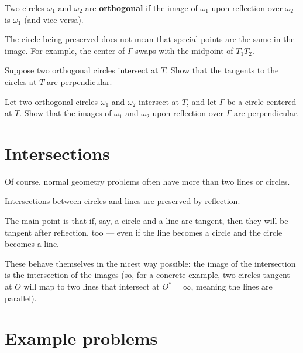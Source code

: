 \documentclass{scrartcl}
\providecommand{\alert}{\textbf}
\begin{document}
\begin{definition}
	Two circles $\omega_1$ and $\omega_2$ are \alert{orthogonal}
	if the image of $\omega_1$ upon reflection over $\omega_2$
	is $\omega_1$ (and vice versa).
\end{definition}

\begin{warning}
	The circle being preserved does not mean that special points
	are the same in the image. For example, the center of $\Gamma$
	swaps with the midpoint of $T_1T_2$.
\end{warning}

\begin{exercise}
	Suppose two orthogonal circles intersect at $T$.
	Show that the tangents to the circles at $T$ are perpendicular.
\end{exercise}

\begin{exercise}
	Let two orthogonal circles $\omega_1$ and $\omega_2$ intersect at $T$,
	and let $\Gamma$ be a circle centered at $T$.
	Show that the images of $\omega_1$ and $\omega_2$
	upon reflection over $\Gamma$ are perpendicular.
\end{exercise}

\newpage
\section{Intersections}
Of course, normal geometry problems often have more than two
lines or circles.

\begin{theorem}
	Intersections between circles and lines are preserved by reflection.
\end{theorem}

The main point is that if, say, a circle and a line are tangent,
then they will be tangent after reflection, too ---
even if the line becomes a circle and the circle becomes a line.

These behave themselves in the nicest way possible:
the image of the intersection is the intersection of the images
(so, for a concrete example, two circles tangent at $O$
will map to two lines that intersect at $O^\ast = \infty$,
meaning the lines are parallel).

\section{Example problems}
\end{document}
